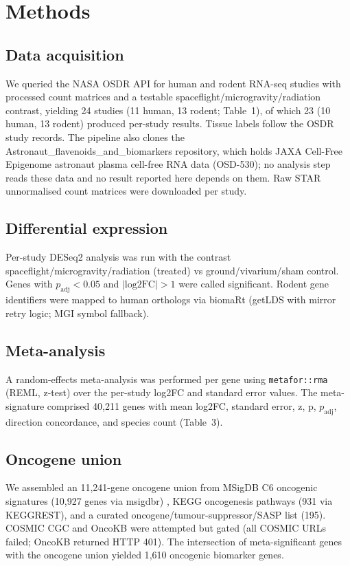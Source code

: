 \documentclass[pdflatex,sn-nature]{sn-jnl}
\begin{document}
\section{Methods}\label{sec:methods}\subsection{Data acquisition}
We queried the NASA OSDR API \cite{beheshti2023} for human and rodent RNA-seq
studies with processed count matrices and a testable
spaceflight/microgravity/radiation contrast, yielding 24 studies (11 human, 13
rodent; Table~1), of which 23 (10 human, 13 rodent) produced per-study results.
Tissue labels follow the OSDR study records. The pipeline also clones the
Astronaut\_flavenoids\_and\_biomarkers repository, which holds JAXA Cell-Free
Epigenome astronaut plasma cell-free RNA data (OSD-530); no analysis step reads
these data and no result reported here depends on them. Raw STAR unnormalised count
matrices were downloaded per study.

\subsection{Differential expression}
Per-study DESeq2 analysis was run with the contrast
spaceflight/microgravity/radiation (treated) vs ground/vivarium/sham control. Genes
with \(p_{\mathrm{adj}} < 0.05\) and \(|\text{log2FC}| > 1\) were called
significant. Rodent gene identifiers were mapped to human orthologs via biomaRt
(getLDS with mirror retry logic; MGI symbol fallback).

\subsection{Meta-analysis}
A random-effects meta-analysis was performed per gene using \texttt{metafor::rma}
(REML, z-test) \cite{viechtbauer2010} over the per-study log2FC and standard error
values. The meta-signature comprised 40{,}211 genes with mean log2FC, standard
error, z, p, \(p_{\mathrm{adj}}\), direction concordance, and species count
(Table~3).

\subsection{Oncogene union}
We assembled an 11{,}241-gene oncogene union from MSigDB C6 oncogenic signatures
(10{,}927 genes via msigdbr) \cite{liberzon2015}, KEGG oncogenesis pathways (931 via
KEGGREST), and a curated oncogene/tumour-suppressor/SASP list (195). COSMIC CGC and
OncoKB were attempted but gated (all COSMIC URLs failed; OncoKB returned HTTP 401).
The intersection of meta-significant genes with the oncogene union yielded 1{,}610
oncogenic biomarker genes.
\end{document}
